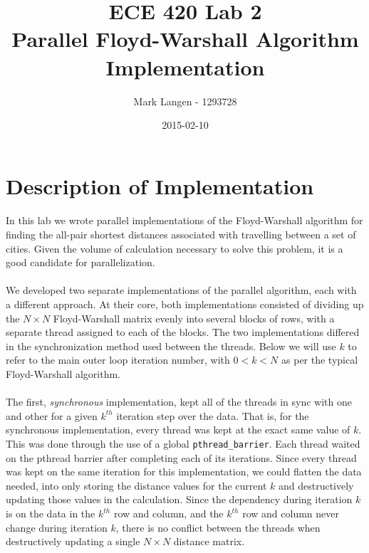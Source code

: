 \documentclass[12pt]{article}
\title{ECE 420 Lab 2\\Parallel Floyd-Warshall Algorithm Implementation}
\date{2015-02-10}
\author{Mark Langen - 1293728}
\begin{document}
	\maketitle
	\newpage

	\section{Description of Implementation}
	\paragraph{}
	In this lab we wrote parallel implementations of the Floyd-Warshall algorithm for finding the all-pair shortest distances associated with travelling between a set of cities. Given the volume of calculation necessary to solve this problem, it is a good candidate for parallelization.
	
	\paragraph{}
	We developed two separate implementations of the parallel algorithm, each with a different approach. At their core, both implementations consisted of dividing up the $N\times N$ Floyd-Warshall matrix evenly into several blocks of rows, with a separate thread assigned to each of the blocks. The two implementations differed in the synchronization method used between the threads. Below we will use $k$ to refer to the main outer loop iteration number, with $0 < k < N$ as per the typical Floyd-Warshall algorithm.

	\paragraph{}
	\begin{center}
	\def\svgwidth{0.5\textwidth}	
	
	\end{center}
	
	\paragraph{}
	The first, \textit{synchronous} implementation, kept all of the threads in sync with one and other for a given $k^{th}$ iteration step over the data. That is, for the synchronous implementation, every thread was kept at the exact same value of $k$. This was done through the use of a global \texttt{pthread\_barrier}. Each thread waited on the pthread barrier after completing each of its iterations. Since every thread was kept on the same iteration for this implementation, we could flatten the data needed, into only storing the distance values for the current $k$ and destructively updating those values in the calculation. Since the dependency during iteration $k$ is on the data in the $k^{th}$ row and column, and the $k^{th}$ row and column never change during iteration $k$, there is no conflict between the threads when destructively updating a single $N\times N$ distance matrix.
	
\end{document}
